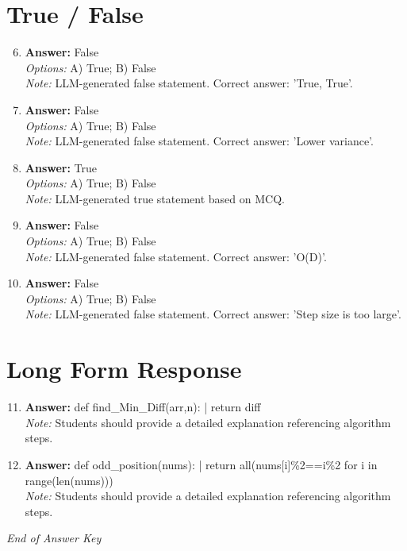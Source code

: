 \documentclass[12pt]{article}
\begin{document}
\section*{True / False}
\begin{enumerate}[label=\arabic*.]
\setcounter{enumi}{5}
\item \textbf{Answer:} False
\\ \textit{Options:} A) True; B) False
\\ \textit{Note:} LLM-generated false statement. Correct answer: 'True, True'.
\item \textbf{Answer:} False
\\ \textit{Options:} A) True; B) False
\\ \textit{Note:} LLM-generated false statement. Correct answer: 'Lower variance'.
\item \textbf{Answer:} True
\\ \textit{Options:} A) True; B) False
\\ \textit{Note:} LLM-generated true statement based on MCQ.
\item \textbf{Answer:} False
\\ \textit{Options:} A) True; B) False
\\ \textit{Note:} LLM-generated false statement. Correct answer: 'O(D)'.
\item \textbf{Answer:} False
\\ \textit{Options:} A) True; B) False
\\ \textit{Note:} LLM-generated false statement. Correct answer: 'Step size is too large'.
\end{enumerate}

\section*{Long Form Response}
\begin{enumerate}[label=\arabic*.]
\setcounter{enumi}{10}
\item \textbf{Answer:} def find\_Min\_Diff(arr,n): | return diff
\\ \textit{Note:} Students should provide a detailed explanation referencing algorithm steps.
\item \textbf{Answer:} def odd\_position(nums): | return all(nums[i]\%2==i\%2 for i in range(len(nums)))
\\ \textit{Note:} Students should provide a detailed explanation referencing algorithm steps.
\end{enumerate}

\vfill
\noindent\textit{End of Answer Key}
\end{document}
